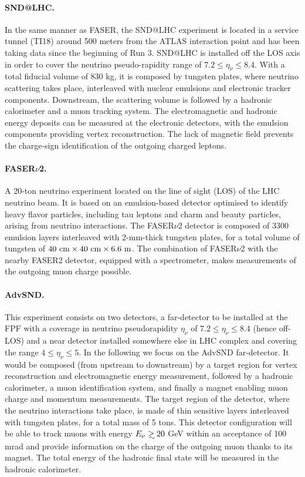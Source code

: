 \paragraph{SND@LHC.}
%
In the same manner as FASER, the SND@LHC experiment is located in a service tunnel (TI18)
around 500 meters from the ATLAS interaction point and has been taking data
since the  beginning of Run 3.
%
SND@LHC is installed off the LOS axis in order to cover the neutrino
pseudo-rapidity range of $7.2 \le \eta_\nu \le 8.4$.
%
With a total fiducial volume of 830 kg, it is composed by tungsten plates,
where neutrino scattering takes place, interleaved with nuclear emulsions and electronic tracker
components.
%
Downstream, the scattering volume is followed by a hadronic calorimeter and a muon tracking system.
%
The electromagnetic
 and hadronic energy deposits can be measured at the electronic detectors, with the emulsion
 components providing vertex reconstruction.
 The lack of magnetic field prevents the charge-sign identification of the outgoing charged leptons.

\paragraph{FASER$\nu$2.}
%
A 20-ton neutrino experiment located on the line of sight (LOS)
of the LHC neutrino beam.
%
It is based on an emulsion-based detector optimised to identify heavy flavor particles, including
tau leptons and charm and beauty particles, arising from neutrino interactions.
%
The FASER$\nu$2 detector is composed of 3300 emulsion layers interleaved with 2-mm-thick tungsten plates,
for a total volume of  tungsten of $40~\rm{cm} \times 40~\rm{cm} \times 6.6~{\rm m}$.
%
The combination of FASER$\nu$2  with the nearby FASER2 detector, equipped with a spectrometer, makes measurements of the outgoing muon charge possible.

 \paragraph{AdvSND.}
 This experiment consists on  two detectors, a far-detector to be installed
 at the FPF with a coverage in neutrino pseudorapidity $\eta_\nu$ of $7.2 \le \eta_\nu \le 8.4$
 (hence off-LOS) and a near detector installed somewhere else in LHC
 complex and covering the range $4 \le \eta_\nu \le 5$.
 In the following we focus on the AdvSND far-detector.
 It would be
 composed (from upstream to downstream) by a target region
 for  vertex reconstruction and electromagnetic energy measurement, followed  by a hadronic calorimeter, a  muon identification system, and finally  a magnet enabling muon charge and momentum measurements.
 The target region of the detector, where the neutrino interactions take place, is made of thin sensitive layers interleaved with tungsten plates, for a total mass of 5 tons.
 This detector configuration will be able to track muons with energy $E_\nu \gsim 20$ GeV
 within an acceptance of 100 mrad and provide information on the charge
 of the  outgoing muon thanks to its magnet.
 The total energy of the hadronic final state will be measured
 in the hadronic calorimeter.

